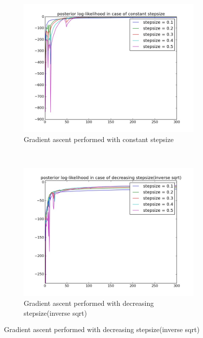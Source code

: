 \documentclass[10pt,a4paper]{article}
\begin{document}
\begin{figure}
    \centering
    \begin{subfigure}[b]{0.65\textwidth}
        \includegraphics[width=\textwidth]{figs/constant_stepsize.jpg}
        \caption{Gradient ascent performed with constant stepsize}
    \end{subfigure}
    ~ %
    \begin{subfigure}[b]{0.65\textwidth}
        \includegraphics[width=\textwidth]{figs/decreasing_stepsize_inv(sqrt).jpg}
        \caption{Gradient ascent performed with decreasing stepsize(inverse sqrt)}

\end{subfigure}
\end{figure}
\end{document}
